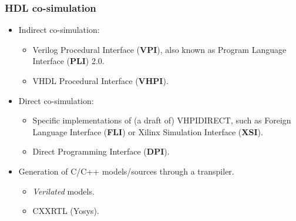 \documentclass{beamer}
\begin{document}
\begin{frame}
\frametitle{HDL co-simulation}
\vfill
\begin{itemize}
\item Indirect co-simulation:
\begin{itemize}
  \item Verilog Procedural Interface (\textbf{VPI}), also known as Program Language Interface (\textbf{PLI}) 2.0.
  \item VHDL Procedural Interface (\textbf{VHPI}).
\end{itemize}

\vfill

\item Direct co-simulation:
\begin{itemize}
  \item Specific implementations of (a draft of) VHPIDIRECT, such as Foreign Language Interface (\textbf{FLI}) or
  Xilinx Simulation Interface (\textbf{XSI}).
  \item Direct Programming Interface (\textbf{DPI}).
\end{itemize}

\vfill

\item Generation of C/C++ models/sources through a transpiler.
\begin{itemize}
  \item \emph{Verilated} models.
  \item CXXRTL (Yosys).
\end{itemize}
\end{itemize}
\vfill
\end{frame}
\end{document}
